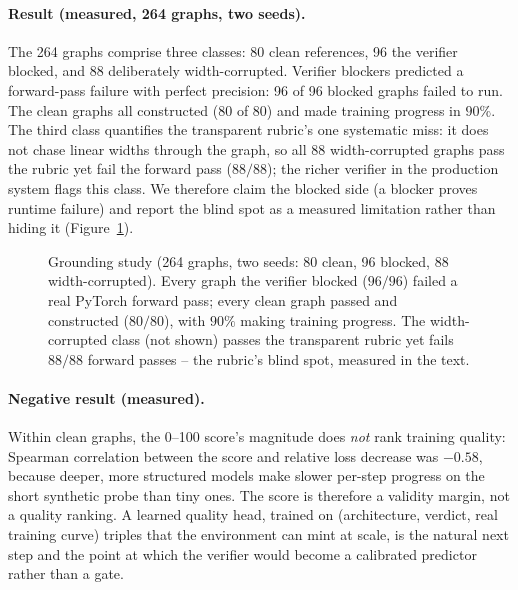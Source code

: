 \documentclass{article}
\begin{document}
\paragraph{Result (measured, 264 graphs, two seeds).} The 264 graphs comprise three classes: 80 clean references, 96 the verifier blocked, and 88 deliberately width-corrupted. Verifier blockers predicted a forward-pass failure with perfect precision: 96 of 96 blocked graphs failed to run. The clean graphs all constructed (80 of 80) and made training progress in $90\%$. The third class quantifies the transparent rubric's one systematic miss: it does not chase linear widths through the graph, so all 88 width-corrupted graphs pass the rubric yet fail the forward pass ($88/88$); the richer verifier in the production system flags this class. We therefore claim the blocked side (a blocker proves runtime failure) and report the blind spot as a measured limitation rather than hiding it (Figure~\ref{fig:grounding}).

\begin{figure}[t]
\centering
{}
\caption{Grounding study (264 graphs, two seeds: 80 clean, 96 blocked, 88 width-corrupted). Every graph the verifier blocked ($96/96$) failed a real PyTorch forward pass; every clean graph passed and constructed ($80/80$), with $90\%$ making training progress. The width-corrupted class (not shown) passes the transparent rubric yet fails $88/88$ forward passes -- the rubric's blind spot, measured in the text.}
\label{fig:grounding}
\end{figure}

\paragraph{Negative result (measured).} Within clean graphs, the 0--100 score's magnitude does \emph{not} rank training quality: Spearman correlation between the score and relative loss decrease was $-0.58$, because deeper, more structured models make slower per-step progress on the short synthetic probe than tiny ones. The score is therefore a validity margin, not a quality ranking. A learned quality head, trained on (architecture, verdict, real training curve) triples that the environment can mint at scale, is the natural next step and the point at which the verifier would become a calibrated predictor rather than a gate.
\end{document}
